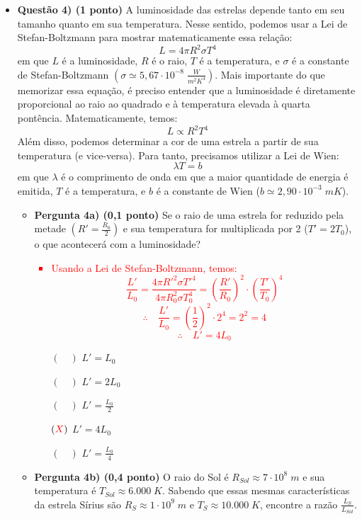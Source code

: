 \documentclass[a4paper, 12pt]{article}
\newcommand{\red}[1]{\textcolor{red}{#1}}
\begin{document}
\begin{flushleft}
\begin{itemize}
		\item \textbf{Questão 4) (1 ponto)} A luminosidade das estrelas depende tanto em seu tamanho quanto em sua temperatura. Nesse sentido, podemos usar a Lei de Stefan-Boltzmann para mostrar matematicamente essa relação:
			$$L=4 \pi R^2 \sigma T^4$$
			em que $L$ é a luminosidade, $R$ é o raio, $T$ é a temperatura, e $\sigma$ é a constante de Stefan-Boltzmann $\left( \sigma \simeq 5,67 \cdot 10^{-8} \; \frac{W}{m^2K^4} \right)$. \linebreak \linebreak
			Mais importante do que memorizar essa equação, é preciso entender que a luminosidade é diretamente proporcional ao raio ao quadrado e à temperatura elevada à quarta pontência. Matematicamente, temos:
				$$L \propto R^2 T^4$$
			Além disso, podemos determinar a cor de uma estrela a partir de sua temperatura (e vice-versa). Para tanto, precisamos utilizar a Lei de Wien:
				$$\lambda T = b$$
				em que $\lambda$ é o comprimento de onda em que a maior quantidade de energia é emitida, $T$ é a temperatura, e $b$ é a constante de Wien ($b \simeq 2,90 \cdot 10^{-3} \; mK$). \linebreak \linebreak
				\begin{itemize}
					\item \textbf{Pergunta 4a) (0,1 ponto)} Se o raio de uma estrela for reduzido pela metade $\left( R'=\frac{R_0}{2} \right)$ e sua temperatura for multiplicada por 2 ($T'=2T_0$), o que acontecerá com a luminosidade?
						\red{\begin{itemize}
							\item Usando a Lei de Stefan-Boltzmann, temos:
								$$\frac{L'}{L_0} = \frac{4 \pi R'^2 \sigma T'^4}{4 \pi R_0^2 \sigma T_0^4} = \left( \frac{R'}{R_0} \right)^2 \cdot \left( \frac{T'}{T_0} \right)^4$$
								$$\therefore \quad \frac{L'}{L_0} = \left( \frac{1}{2} \right)^2 \cdot 2^4 = 2^2 = 4$$
								$$\therefore \quad L' = 4 L_0$$
						\end{itemize}}
						\begin{itemize}
							\item[$(\quad)$] $L'=L_0$
							\item[$(\quad)$] $L'=2L_0$
							\item[$(\quad)$] $L'=\frac{L_0}{2}$
							\item[$(\red{X})$] $L'=4L_0$
							\item[$(\quad)$] $L'=\frac{L_0}{4}$
						\end{itemize}
					\item \textbf{Pergunta 4b) (0,4 ponto)} O raio do Sol é $R_{Sol} \approx 7 \cdot 10^8 \; m$ e sua temperatura é $T_{Sol} \approx 6.000 \; K$. Sabendo que essas mesmas características da estrela Sírius são $R_S \approx 1 \cdot 10^9 \; m$ e $T_S \approx 10.000 \; K$, encontre a razão $\frac{L_S}{L_{Sol}}$.

\end{itemize}
\end{itemize}
\end{flushleft}
\end{document}
